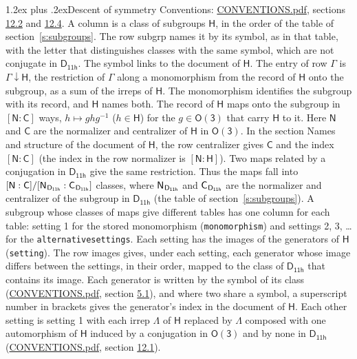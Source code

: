 \documentclass[10pt,a4paper]{article}
\makeatletter
\renewcommand\section{\@startsection{section}{1}{\z@}{-3ex plus -1ex minus -.2ex}%
  {1.2ex plus .2ex}{\normalfont\large\sffamily\bfseries\color{parttitle}}}
\numberwithin{equation}{section}
\newcommand{\grp}[1]{\mathsf{#1}}
\newcommand{\grpindex}[2]{[#1 : #2]}
\newcommand{\restr}[2]{#1\!\downarrow#2}
\newcommand{\hairsp}{\mkern1mu}
\makeatother
\begin{document}
\section{Descent of symmetry}\label{s:subduction}
Conventions: \href{../../CONVENTIONS.pdf}{CONVENTIONS.pdf}, sections \href{../../CONVENTIONS.pdf\#conv.12.2}{12.2} and \href{../../CONVENTIONS.pdf\#conv.12.4}{12.4}.
A column is a class of subgroups $\grp{H}$, in the order of the table of section~\ref{s:subgroups}. The row subgrp names it by its symbol, as in that table, with the letter that distinguishes classes with the same symbol, which are not conjugate in $\grp{D_{11h}}$. The symbol links to the document of $\grp{H}$. The entry of row $\Gamma$ is $\restr{\Gamma}{\grp{H}}$, the restriction of $\Gamma$ along a monomorphism from the record of $\grp{H}$ onto the subgroup, as a sum of the irreps of $\grp{H}$. The monomorphism identifies the subgroup with its record, and $\grp{H}$ names both. \label{n:group.normalizer.o3}\label{n:group.centralizer.o3}The record of $\grp{H}$ maps onto the subgroup in $\grpindex{\grp{N}}{\grp{C}}$ ways, $h \mapsto g h g^{-1}$ ($h \in \grp{H}$) for the $g \in \grp{O(3)}$ that carry $\grp{H}$ to it. Here $\grp{N}$ and $\grp{C}$ are the normalizer and centralizer of $\grp{H}$ in \href{O3.pdf}{$\grp{O(3)}$}. In the section Names and structure of the document of $\grp{H}$, the row centralizer gives $\grp{C}$ and the index $\grpindex{\grp{N}}{\grp{C}}$ (the index in the row normalizer is $\grpindex{\grp{N}}{\grp{H}}$). Two maps related by a conjugation in $\grp{D_{11h}}$ give the same restriction. Thus the maps fall into $\grpindex{\grp{N}}{\grp{C}}/\grpindex{\grp{N}_{\hairsp \grp{D_{11h}}}}{\grp{C}_{\hairsp \grp{D_{11h}}}}$ classes, where $\grp{N}_{\hairsp \grp{D_{11h}}}$ and $\grp{C}_{\hairsp \grp{D_{11h}}}$ are the normalizer and centralizer of the subgroup in $\grp{D_{11h}}$ (the table of section~\ref{s:subgroups}). \label{n:head.setting}A subgroup whose classes of maps give different tables has one column for each table: setting 1 for the stored monomorphism (\texttt{monomorphism}) and settings 2, 3, \dots{} for the \texttt{alternativesettings}. Each setting has the images of the generators of $\grp{H}$ (\texttt{setting}). \label{n:head.images}The row images gives, under each setting, each generator whose image differs between the settings, in their order, mapped to the class of $\grp{D_{11h}}$ that contains its image. Each generator is written by the symbol of its class (\href{../../CONVENTIONS.pdf}{CONVENTIONS.pdf}, section \href{../../CONVENTIONS.pdf\#conv.5.1}{5.1}), and where two share a symbol, a superscript number in brackets gives the generator's index in the document of $\grp{H}$. \label{n:irrep.Delta}Each other setting is setting 1 with each irrep $\Lambda$ of $\grp{H}$ replaced by $\Lambda$ composed with one automorphism of $\grp{H}$ induced by a conjugation in \href{O3.pdf}{$\grp{O(3)}$} and by none in $\grp{D_{11h}}$ (\href{../../CONVENTIONS.pdf}{CONVENTIONS.pdf}, section \href{../../CONVENTIONS.pdf\#conv.12.1}{12.1}).
\end{document}
